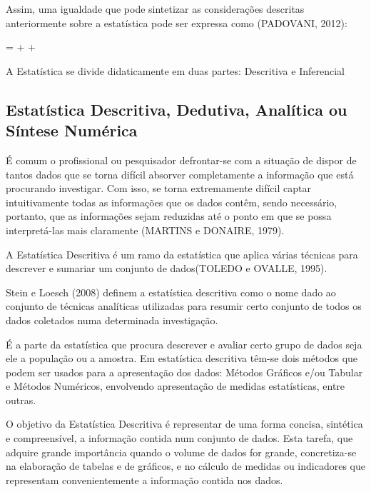 \newpage
Assim, uma igualdade que pode sintetizar as considerações descritas anteriormente sobre a estatística pode ser expressa como (PADOVANI, 2012):

\begin{center}
 =  +  + 
\end{center}

A Estatística se divide didaticamente em duas partes: Descritiva e Inferencial

\subsection{Estatística Descritiva, Dedutiva, Analítica ou Síntese Numérica}

É comum o profissional ou pesquisador defrontar-se com a situação de dispor de tantos dados que se torna difícil absorver completamente a informação que está procurando investigar. Com isso, se torna extremamente difícil captar intuitivamente todas as informações que os dados contêm, sendo necessário, portanto, que as informações sejam reduzidas até o ponto em que se possa interpretá-las mais claramente (MARTINS e DONAIRE, 1979).\vskip0.3cm

A Estatística Descritiva é um ramo da estatística que aplica várias técnicas para descrever e sumariar um conjunto de dados(TOLEDO e OVALLE, 1995).\vskip0.3cm

Stein e Loesch (2008) definem a estatística descritiva como o nome dado ao conjunto de técnicas analíticas utilizadas para resumir certo conjunto de todos os dados coletados numa determinada investigação.\vskip0.3cm

É a parte da estatística que procura descrever e avaliar certo grupo de dados seja ele a população ou a amostra. Em estatística descritiva têm-se dois métodos que podem ser usados para a apresentação dos dados: Métodos Gráficos e/ou Tabular e Métodos Numéricos, envolvendo apresentação de medidas estatísticas, entre outras.\vskip0.3cm

O objetivo da Estatística Descritiva é representar de uma forma concisa, sintética e compreensível, a informação contida num conjunto de dados. Esta tarefa, que adquire grande importância quando o volume de dados for grande, concretiza-se na elaboração de tabelas e de gráficos, e no cálculo de medidas ou indicadores que representam convenientemente a informação contida nos dados.\vskip0.3cm

